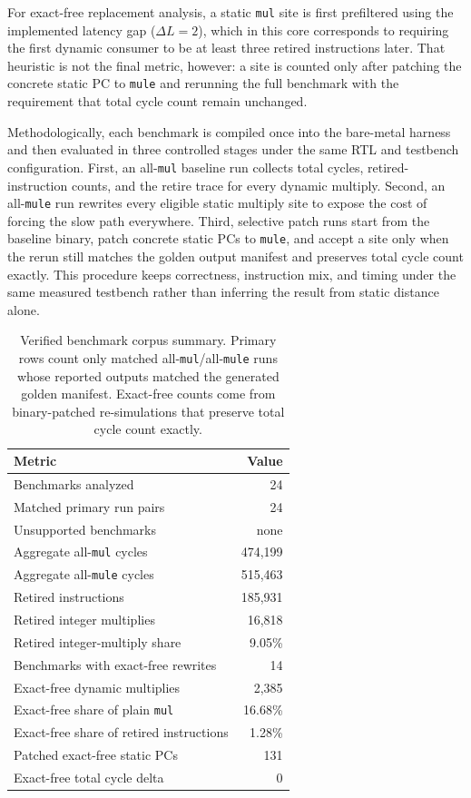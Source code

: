 For exact-free replacement analysis, a static \texttt{mul} site is first
prefiltered using the implemented latency gap ($\Delta L = 2$), which in
this core corresponds to requiring the first dynamic consumer to be at
least three retired instructions later. That heuristic is not the final
metric, however: a site is counted only after patching the concrete
static PC to \texttt{mule} and rerunning the full benchmark with the
requirement that total cycle count remain unchanged.

Methodologically, each benchmark is compiled once into the bare-metal
harness and then evaluated in three controlled stages under the same RTL
and testbench configuration. First, an all-\texttt{mul} baseline run
collects total cycles, retired-instruction counts, and the retire trace
for every dynamic multiply. Second, an all-\texttt{mule} run rewrites
every eligible static multiply site to expose the cost of forcing the
slow path everywhere. Third, selective patch runs start from the
baseline binary, patch concrete static PCs to \texttt{mule}, and accept
a site only when the rerun still matches the golden output manifest and
preserves total cycle count exactly. This procedure keeps correctness,
instruction mix, and timing under the same measured testbench rather
than inferring the result from static distance alone.

\begin{table}[t]
\centering
\caption{Verified benchmark corpus summary. Primary rows count only matched all-\texttt{mul}/all-\texttt{mule} runs whose reported outputs matched the generated golden manifest. Exact-free counts come from binary-patched re-simulations that preserve total cycle count exactly.}
\label{tab:benchmark-verified-overview}
\begin{tabular}{lr}
\hline
Metric & Value \\
\hline
Benchmarks analyzed & 24 \\
Matched primary run pairs & 24 \\
Unsupported benchmarks & none \\
Aggregate all-\texttt{mul} cycles & 474,199 \\
Aggregate all-\texttt{mule} cycles & 515,463 \\
Retired instructions & 185,931 \\
Retired integer multiplies & 16,818 \\
Retired integer-multiply share & 9.05\% \\
Benchmarks with exact-free rewrites & 14 \\
Exact-free dynamic multiplies & 2,385 \\
Exact-free share of plain \texttt{mul} & 16.68\% \\
Exact-free share of retired instructions & 1.28\% \\
Patched exact-free static PCs & 131 \\
Exact-free total cycle delta & 0 \\
\hline
\end{tabular}
\end{table}

